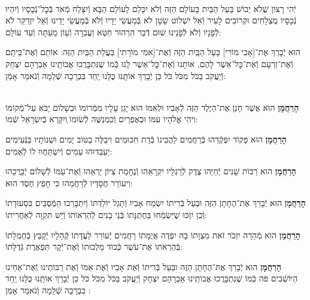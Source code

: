 \documentclass[twoside, openany, parskip=half, 11pt]{book}
\begin{document}
\begin{footnotesize}
\\
יְֿהִי רָצוֹן שֶׁלֹא יֵבוֹשׁ בַּעַל הַבַּיִת בָּעוֹלָם הַזֶּה וְֿלֹא יִכָּלֵם לָעוֹלָם הַבָּא וְֿיִצְלַח מְֿאֹד בְּֿכׇל־נְֿכָסָיו וְֿיִהְיוּ נְֿכָסָיו מֻצְלָחִים וּקְרוֹבִים לָעִיר וְֿאַל יִשְׁלוֹט שָׂטָן לֹא בְּֿמַעֲשֵׂי יָדָיו וְֿלֹא בְּֿמַעֲשֵׂי יָדֵינוּ וְֿאַל יִזְדַקֵּר לֹא לְֿפָנָיו וְֿלֹא לְֿפָנֵינוּ שׁוּם דְֿבַר הִרְהוּר חֵטְא וַעֲבֵרָה וְֿעָוֹן מֵעַתָּה וְֿעַד עוֹלָם:

\end{footnotesize}

הוּא יְֿבָרֵךְ אֶת־[אָבִי מוֹרִי] בַּעַל הַבַּֽיִת הַזֶּה וְֿאֶת־[אִמִּי מוֹרָתִי] בַּעֲלַת הַבַּֽיִת הַזֶּה: אוֹתָם וְֿאֶת־בֵּיתָם וְֿאֶת־זַרְעָם וְֿאֶת־כׇּל־אַשֶׁר לָהֶם, אוֹתָנוּ וְֿאֶת־כׇּל־אַשֶׁר לָֽנוּ כְּֿמוֹ שֶׁנִּתְבָּרֲכוּ אֲבוֹתֵֽינוּ אַבְרָהָם יִצְחָק וְֿיַעֲקֹב בַּכֹּל מִכֹּל כֹּל כֵּן יְֿבָרֵךְ אוֹתָֽנוּ כֻּלָּנוּ יַֽחַד בִּבְרָכָה שְֿׁלֵמָה וְֿנֹאמַר אָמֵן:

\begin{sometimes}

\\
\textbf{הָרַחֲמָן}
הוּא אֲשֶׁר חָנַן אֶת־הַיֶּלֶד הַזֶּה לְֿאָבִיו וּלְאִמּוֹ הוּא יָגֵן עָלָיו מִמְּֿרוֹמוֹ וּבְשָׁלוֹם יָבֹא עַל־מְֿקוֹמוֹ וִיהִי אֱלֹהָיו עִמּוֹ וּכְאֶפְרַיִם וְֿכִמְנַשֶּׁה לְֿשׂוּמוֹ ְויִקָּרֵא בְֿיִשְׂרָאֵל שְֿׁמוֹ:

\textbf{הָרַחֲמָן}
הוּא פָּקוֹד יִפְקְֿדֵהוּ בְּֿרַחֲמִים לַהֲבִינוֹ בְּֿדָת חִכּוּמִים וִיבַלֶּה בַטּוֹב יָמִים וּשְׁנוֹתָיו בַּנְּֿעִימִים יַעַבְדוּהוּ עַמִּים וְֿיִשְׁתַּחֲווּ לוֹ לְֿאֻמִּים:

\textbf{הָרַחֲמָן}
הוּא רַבּוֹת שָׁנִים יְֿחַיֵּהוּ צֶדֶק לְֿרַגְלָיו יִקְרָאֵהוּ וְֿנֶחָמַת צִיּוֹן יַרְאֵהוּ וְֿאֶת־עַמּוֹ לְֿשָׁלוֹם יְֿבָרֲכֵהוּ וִיעוֹרֵר חֲסָדָיו לְֿרַחֲמֵהוּ כִּי חָפֵץ חֶסֶד הוּא:

\textbf{הָרַחֲמָן}
הוּא יְֿבָרֵךְ אֶת־הֶחָתָן הַזֶּה וּבַעַל בְּֿרִיתוֹ יִשְׂמַח אָבִיו וְֿתָגֵל יוֹלַדְתּוֹ וְֿיִתְבָּרַכוּ הַמְֿסֻבִּים בִּסְעוּדָתוֹ וְֿכֵן יִזְכּוּ שֶׁיִּשְׂמְֿחוּ בַּחֲתֻנָּתוֹ בְּֿנֵי בָנִים לְֿהַרְאוֹתוֹ וְֿיֵשׁ תִּקְוָה לְֿאַחֲרִיתוֹ:

\textbf{הָרַחֲמָן}
הוּא מְֿהֵרָה יִזְכֹּר זֹאת מִצְוָתוֹ בָּהּ יִפְדֶה אֲיֻמָּתוֹ רַחֲמִים יְֿעוֹרֵר לַעֲדָתוֹ קְֿהָלָיו יְֿקַבֵּץ בְּֿחֶמְלָתוֹ בְּֿהַרְאֹתוֹ אֶת־עֹשֶׁר כְּֿבוֹד מַלְכוּתוֹ וְֿאֶת־יְֿקָר תִּפְאֶרֶת גְּֿדֻלָּתוֹ:

\textbf{הָרַחֲמָן}
הוּא יְֿבָרֵךְ אֶת־הֶחָתָן הַזֶּה וּבַּעַל בְּֿרִיתוֹ וְֿאֶת אָבִיו וְֿאֶת אִמּוֹ וְֿאֶת רַבּוֹתֵינוּ וְֿאֶת־אַחֵינוּ הַיּוֹשְֿׁבִים פֹּה כְּֿמוֹ שֶׁנִתְבָּרֲכוּ אֲבוֹתֵֽינוּ אַבְרָהָם יִצְחָק וְֿיַעֲקֹב בַּכֹּל מִכֹּל כֹּל כֵּן יְֿבָרֵךְ אוֹתָֽנוּ כֻּלָּנוּ יַֽחַד בִּבְרָכָה שְֿׁלֵמָה וְֿנֹאמַר אָמֵן
:

\end{sometimes}
\end{document}
